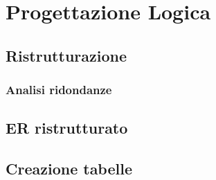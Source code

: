 \section{Progettazione Logica}
\subsection{Ristrutturazione}
\subsubsection{Analisi ridondanze}
\subsection{ER ristrutturato}
\subsection{Creazione tabelle}
